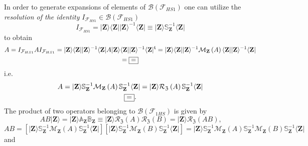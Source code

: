 \documentclass[aps, preprint]{revtex4}
\begin{document}
In order to generate expansions of elements of $\mathcal{B} \left (\mathcal{F}_{H S 1}\right )$ one can utilize the \emph{resolution of the identity }$I_{\mathcal{F}_{H S 1}} \in \mathcal{B} \left (\mathcal{F}_{H S 1}\right )$
\begin{equation}I_{\mathcal{F}_{H S 1}} =\vert \mathbf{Z} \rangle  \langle \mathbf{Z}\vert \vert \mathbf{Z} \rangle ^{ -1} \langle \mathbf{Z}\vert  \equiv \vert \mathbf{Z} \rangle \mathbb{S}_{\mathbf{Z}}^{ -1} \langle \mathbf{Z}\vert 
\end{equation}to obtain
\begin{gather}A =I_{\mathcal{F}_{H S 1}} A I_{\mathcal{F}_{H S 1}} =\vert \mathbf{Z} \rangle  \langle \mathbf{Z}\vert \vert \mathbf{Z} \rangle ^{ -1} \langle \mathbf{Z}\vert A\vert \mathbf{Z} \rangle  \langle \mathbf{Z}\vert \vert \mathbf{Z} \rangle ^{ -1}  \langle \mathbf{Z}\vert ^{\mathfrak{t}} =\vert \mathbf{Z} \rangle  \langle \mathbf{Z}\vert \vert \mathbf{Z} \rangle ^{ -1} \mathcal{M}_{\mathbf{Z}} \left (A\right ) \langle \mathbf{Z}\vert \vert \mathbf{Z} \rangle ^{ -1} \langle \mathbf{Z}\vert  \\
 =\fbox{=}\end{gather}i.e.
\begin{gather}A =\vert \mathbf{Z} \rangle \mathbb{S}_{\mathbf{Z}}^{ -1} \mathcal{M}_{\mathbf{Z}} \left (A\right ) \mathbb{S}_{\mathbf{Z}}^{ -1} \langle \mathbf{Z}\vert  =\vert \mathbf{Z} \rangle \mathcal{R}_{\mathfrak{Z}} \left (A\right ) \mathbb{S}_{\mathbf{Z}}^{ -1} \langle \mathbf{Z}\vert  \\
\fbox{=}\text{.}\end{gather}The product of two operators belonging to $\mathcal{B} \left (\mathcal{F}_{1 H S}\right )$ is given by
\begin{equation}A B\vert \mathbf{Z} \rangle  =\vert \mathbf{Z} \rangle \mathbb{A}_{\mathbf{Z}} \mathbb{B}_{\mathbf{Z}} \equiv \vert \mathbf{Z} \rangle \mathcal{R}_{\mathfrak{Z}} \left (A\right ) \mathcal{R}_{\mathfrak{Z}} \left (B\right ) =\vert \mathbf{Z} \rangle \mathcal{R}_{\mathfrak{Z}} \left (A B\right )\text{,}
\end{equation}
\begin{equation}A B =\left [\vert \mathbf{Z} \rangle \mathbb{S}_{\mathbf{Z}}^{ -1} \mathcal{M}_{\mathbf{Z}} \left (A\right ) \mathbb{S}_{\mathbf{Z}}^{ -1} \langle \mathbf{Z}\vert \right ] \left [\vert \mathbf{Z} \rangle \mathbb{S}_{\mathbf{Z}}^{ -1} \mathcal{M}_{\mathbf{Z}} \left (B\right ) \mathbb{S}_{\mathbf{Z}}^{ -1} \langle \mathbf{Z}\vert \right ] =\vert \mathbf{Z} \rangle \mathbb{S}_{\mathbf{Z}}^{ -1} \mathcal{M}_{\mathbf{Z}} \left (A\right ) \mathbb{S}_{\mathbf{Z}}^{ -1} \mathcal{M}_{\mathbf{Z}} \left (B\right ) \mathbb{S}_{\mathbf{Z}}^{ -1} \langle \mathbf{Z}\vert 
\end{equation}and
\end{document}
